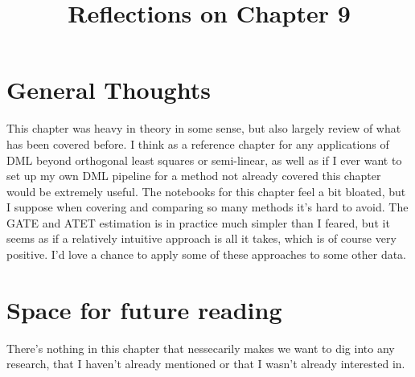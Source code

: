 \documentclass[10pt, english]{article}
\begin{document}
\title{Reflections on Chapter 9}
\date{}
\author{}

\maketitle


\section*{General Thoughts}
This chapter was heavy in theory in some sense, but also largely review of what has been covered before. I think as a reference chapter for any applications of DML beyond orthogonal least squares or semi-linear, as well as if I ever want to set up my own DML pipeline
for a method not already covered this chapter would be extremely useful. The notebooks for this chapter feel a bit bloated, but I suppose when covering and comparing so many methods it's hard to avoid. The GATE and ATET estimation is in practice much simpler than I feared,
but it seems as if a relatively intuitive approach is all it takes, which is of course very positive. I'd love a chance to apply some of these approaches to some other data.


\section*{Space for future reading}
There's nothing in this chapter that nessecarily makes we want to dig into any research, that I haven't already mentioned or that I wasn't already interested in.
\end{document}
